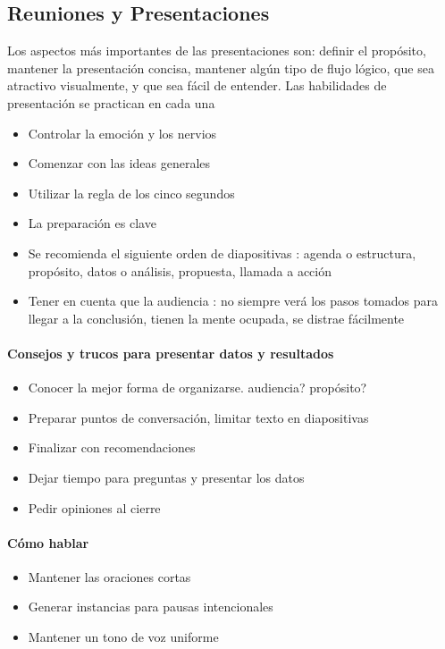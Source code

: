 \subsection{Reuniones y Presentaciones}
Los aspectos más importantes de las presentaciones son: definir el propósito, mantener la presentación concisa, mantener algún tipo de flujo lógico, que sea atractivo visualmente, y que sea fácil de entender. Las habilidades de presentación se practican en cada una
\begin{itemize}
    \item {Controlar la emoción y los nervios}
    \item {Comenzar con las ideas generales}
    \item {Utilizar la regla de los cinco segundos}
    \item {La preparación es clave}
    \item {Se recomienda el siguiente orden de diapositivas : agenda o estructura, propósito, datos o análisis, propuesta, llamada a acción}
    \item {Tener en cuenta que la audiencia : no siempre verá los pasos tomados para llegar a la conclusión, tienen la mente ocupada, se distrae fácilmente}
\end{itemize}

\paragraph{Consejos y trucos para presentar datos y resultados}
\begin{itemize}
    \item {Conocer la mejor forma de organizarse. audiencia? propósito?}
    \item {Preparar puntos de conversación, limitar texto en diapositivas}
    \item {Finalizar con recomendaciones}
    \item {Dejar tiempo para preguntas y presentar los datos}
    \item {Pedir opiniones al cierre}
\end{itemize}

\paragraph{Cómo hablar}
\begin{itemize}
    \item {Mantener las oraciones cortas}
    \item {Generar instancias para pausas intencionales}
    \item {Mantener un tono de voz uniforme}
\end{itemize}

